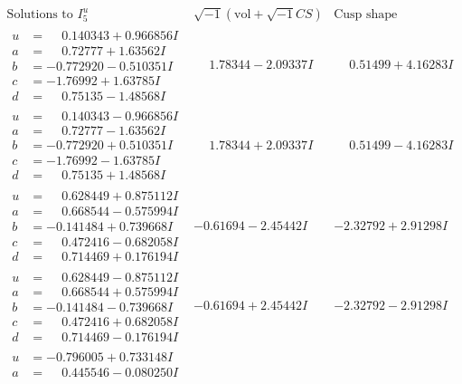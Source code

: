 \documentclass[1p]{elsarticle_modified}
\theoremstyle{definition}
\newcommand{\I}{\sqrt{-1}}
\begin{document}
$$\begin{array}{c|c|c}  
\text{Solutions to }I^u_{5}& \I (\text{vol} + \sqrt{-1}CS) & \text{Cusp shape}\\
 \hline 
\begin{aligned}
u &= \phantom{-}0.140343 + 0.966856 I \\
a &= \phantom{-}0.72777 + 1.63562 I \\
b &= -0.772920 - 0.510351 I \\
c &= -1.76992 + 1.63785 I \\
d &= \phantom{-}0.75135 - 1.48568 I\end{aligned}
 & \phantom{-}1.78344 - 2.09337 I & \phantom{-}0.51499 + 4.16283 I \\ \hline\begin{aligned}
u &= \phantom{-}0.140343 - 0.966856 I \\
a &= \phantom{-}0.72777 - 1.63562 I \\
b &= -0.772920 + 0.510351 I \\
c &= -1.76992 - 1.63785 I \\
d &= \phantom{-}0.75135 + 1.48568 I\end{aligned}
 & \phantom{-}1.78344 + 2.09337 I & \phantom{-}0.51499 - 4.16283 I \\ \hline\begin{aligned}
u &= \phantom{-}0.628449 + 0.875112 I \\
a &= \phantom{-}0.668544 - 0.575994 I \\
b &= -0.141484 + 0.739668 I \\
c &= \phantom{-}0.472416 - 0.682058 I \\
d &= \phantom{-}0.714469 + 0.176194 I\end{aligned}
 & -0.61694 - 2.45442 I & -2.32792 + 2.91298 I \\ \hline\begin{aligned}
u &= \phantom{-}0.628449 - 0.875112 I \\
a &= \phantom{-}0.668544 + 0.575994 I \\
b &= -0.141484 - 0.739668 I \\
c &= \phantom{-}0.472416 + 0.682058 I \\
d &= \phantom{-}0.714469 - 0.176194 I\end{aligned}
 & -0.61694 + 2.45442 I & -2.32792 - 2.91298 I \\ \hline\begin{aligned}
u &= -0.796005 + 0.733148 I \\
a &= \phantom{-}0.445546 - 0.080250 I \\

\end{aligned}
\end{array}$$
\end{document}
